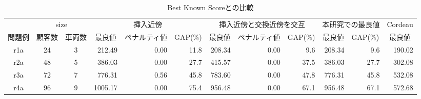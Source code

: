 \begin{landscape}
  \begin{table}[]
    \renewcommand{\arraystretch}{0.8}
    \caption{Best Known Scoreとの比較}
    \label{cordeau}
  \begin{tabular}{cccrrrrrrrrr}
  \hline
  \multicolumn{1}{l}{} & \multicolumn{2}{c}{size}                    & \multicolumn{3}{c}{挿入近傍}                                                                 & \multicolumn{3}{c}{挿入近傍と交換近傍を交互}                                                             & \multicolumn{2}{l}{本研究での最良値}                          & \multicolumn{1}{c}{Cordeau} \\ \cline{2-12}
  問題例                  & 顧客数                  & 車両数                  & \multicolumn{1}{c}{最良値}     & \multicolumn{1}{c}{ペナルティ値} & \multicolumn{1}{c}{GAP(\%)} & \multicolumn{1}{c}{最良値} & \multicolumn{1}{c}{ペナルティ値} & \multicolumn{1}{c}{GAP(\%)} & \multicolumn{1}{c}{最良値} & \multicolumn{1}{l}{GAP(\%)} & \multicolumn{1}{c}{最良値}              \\ \cline{2-12}
  r1a                  & 24                   & 3                    & 212.49                      & 0.00                       & 11.8                        & 208.34                  & 0.00                       & 9.6                         & 208.34                  & 9.6                         & 190.02                               \\
  r2a                  & 48                   & 5                    & 386.03                      & 0.00                       & 27.7                        & 415.57                  & 0.00                       & 37.5                        & 386.03                  & 27.7                        & 302.08                               \\
  r3a                  & 72                   & 7                    & 776.31                      & 0.56                       & 45.8                        & 783.60                  & 0.00                       & 47.8                        & 776.31                  & 45.8                        & 532.08                               \\
  r4a                  & 96                   & 9                    & 1005.17                     & 0.00                       & 75.4                        & 956.48                  & 0.00                       & 67.1                        & 956.48                  & 67.1                        & 572.68                               \\

\end{tabular}
\end{table}
\end{landscape}
